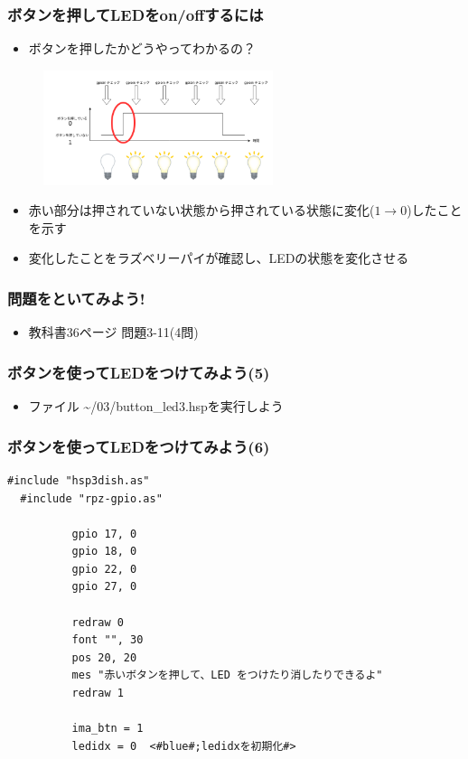 \begin{frame}
  \frametitle{ボタンを押してLEDをon/offするには}
  \begin{itemize}
    \item ボタンを押したかどうやってわかるの？
  \end{itemize}
  \begin{figure}
    \centering
    \includegraphics[width=0.6\textwidth]{../images/chap03/button_push.png}
  \end{figure}
  \begin{itemize}
    \item 赤い部分は押されていない状態から押されている状態に変化($1\rightarrow0$)したことを示す
    \item 変化したことをラズベリーパイが確認し、LEDの状態を変化させる
  \end{itemize}
\end{frame}

\begin{frame}
  \frametitle{問題をといてみよう!}
  \begin{itemize}
    \item 教科書36ページ 問題3-11(4問)
  \end{itemize}
\end{frame}

\begin{frame}
  \frametitle{ボタンを使ってLEDをつけてみよう(5)}
  \begin{itemize}
    \item ファイル \rightarrow \sim/03/button\_led3.hspを実行しよう
  \end{itemize}
\end{frame}

\begin{frame}[fragile]
  \frametitle{ボタンを使ってLEDをつけてみよう(6)}
  \begin{lstlisting}[title=button\_led3.hsp, label=button_led3.hsp]
  #include "hsp3dish.as"
  #include "rpz-gpio.as"
  
          gpio 17, 0   
          gpio 18, 0
          gpio 22, 0
          gpio 27, 0

          redraw 0
          font "", 30
          pos 20, 20
          mes "赤いボタンを押して、LED をつけたり消したりできるよ"
          redraw 1

          ima_btn = 1 
          ledidx = 0  <#blue#;ledidxを初期化#>
  \end{lstlisting}
\end{frame}

